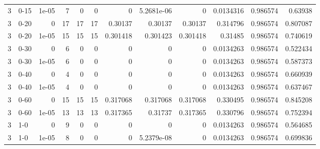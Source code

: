 \begin{tabular}{rlrrrrrrrrrr}
     3 & 0-15   &      1e-05 &           7 &                 0 &                 0 &     0           &     5.2681e-06  &      0           &        0.0134316 &               0.986574 &           0.63938  \\
     3 & 0-20   &      0     &          17 &                17 &                17 &     0.30137     &     0.30137     &      0.30137     &        0.314796  &               0.986574 &           0.807087 \\
     3 & 0-20   &      1e-05 &          15 &                15 &                15 &     0.301418    &     0.301423    &      0.301418    &        0.31485   &               0.986574 &           0.740619 \\
     3 & 0-30   &      0     &           6 &                 0 &                 0 &     0           &     0           &      0           &        0.0134263 &               0.986574 &           0.522434 \\
     3 & 0-30   &      1e-05 &           6 &                 0 &                 0 &     0           &     0           &      0           &        0.0134263 &               0.986574 &           0.587373 \\
     3 & 0-40   &      0     &           4 &                 0 &                 0 &     0           &     0           &      0           &        0.0134263 &               0.986574 &           0.660939 \\
     3 & 0-40   &      1e-05 &           4 &                 0 &                 0 &     0           &     0           &      0           &        0.0134263 &               0.986574 &           0.637467 \\
     3 & 0-60   &      0     &          15 &                15 &                15 &     0.317068    &     0.317068    &      0.317068    &        0.330495  &               0.986574 &           0.845208 \\
     3 & 0-60   &      1e-05 &          13 &                13 &                13 &     0.317365    &     0.31737     &      0.317365    &        0.330796  &               0.986574 &           0.752394 \\
     3 & 1-0    &      0     &           9 &                 0 &                 0 &     0           &     0           &      0           &        0.0134263 &               0.986574 &           0.564685 \\
     3 & 1-0    &      1e-05 &           8 &                 0 &                 0 &     0           &     5.2379e-08  &      0           &        0.0134263 &               0.986574 &           0.699836 \\

\end{tabular}
